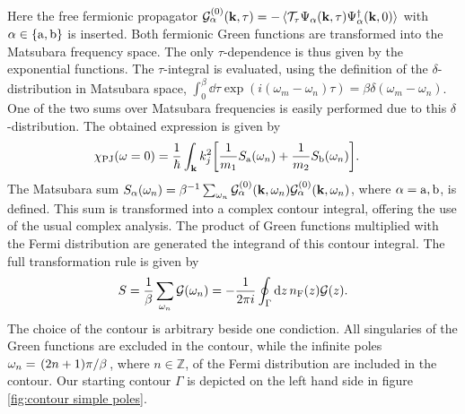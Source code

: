 %
Here the free fermionic propagator $\mathcal{G}_{\alpha}^{(0)}(\vb{k},\tau) = -\expval*{\mathcal{T}_{\tau} \Psi_{\alpha}(\vb{k},\tau) \Psi_{\alpha}^{\dag}(\vb{k},0)}$ with $\alpha \in \{\mathrm{a},\mathrm{b}\}$ is inserted.
Both fermionic Green functions are transformed into the Matsubara frequency space.
The only $\tau$-dependence is thus given by the exponential functions.
The $\tau$-integral is evaluated, using the definition of the $\delta$-distribution in Matsubara space, $\int_{0}^{\beta} \dd{\tau} \exp(i(\omega_{m} - \omega_{n})\tau) = \beta \delta(\omega_{m} - \omega_{n})$.
One of the two sums over Matsubara frequencies is easily performed due to this $\delta$-distribution.
The obtained expression is given by
%
\begin{align}
	\chi_{\mathrm{PJ}}(\omega = 0) &= 
		\frac{1}{\hbar} 
		\int_{\vb{k}} 
		k_{j}^{2}
		\bigg[
			\frac{1}{m_{1}}
			S_{\mathrm{a}}(\omega_{n})
			+
			\frac{1}{m_{2}}
			S_{\mathrm{b}}(\omega_{n})
		\bigg].
\end{align}
%
The Matsubara sum $S_{\alpha}(\omega_{n}) = \beta^{-1} \sum_{\omega_{n}} \mathcal{G}_{\alpha}^{(0)}(\vb{k},\omega_{n}) \mathcal{G}_{\alpha}^{(0)}(\vb{k},\omega_{n})$, where $\alpha = \mathrm{a}, \mathrm{b}$, is defined.
This sum is transformed into a complex contour integral, offering the use of the usual complex analysis.
The product of Green functions multiplied with the Fermi distribution are generated the integrand of this contour integral.
The full transformation rule is given by
%
\begin{align}
	S = \frac{1}{\beta} \sum\limits_{\omega_{n}} \mathcal{G}(\omega_{n}) = -\frac{1}{2\pi i} \oint_{\Gamma} \dd{z} n_{\mathrm{F}}(z) \mathcal{G}(z).
\end{align}
%
The choice of the contour is arbitrary beside one condiction.
All singularies of the Green functions are excluded in the contour, while the infinite poles $\omega_{n} = \flatfrac{(2n+1)\pi}{\beta}$, where $n\in\mathbb{Z}$, of the Fermi distribution are included in the contour.
Our starting contour $\Gamma$ is depicted on the left hand side in figure \ref{fig:contour simple poles}.

